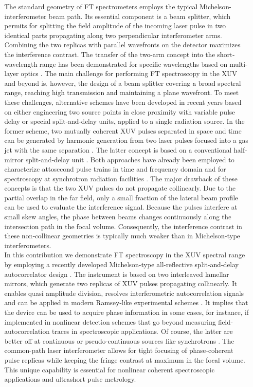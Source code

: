 \documentclass[fleqn,10pt]{wlscirep}
\begin{document}
The standard geometry of FT spectrometers employs the typical Michelson-interferometer beam path. Its essential component is a beam splitter, which permits for splitting the field amplitude of the incoming laser pulse in two identical parts propagating along two perpendicular interferometer arms. Combining the two replicas with parallel wavefronts on the detector maximizes the interference contrast. The transfer of the two-arm concept into the short-wavelength range has been demonstrated for specific wavelengths based on multi-layer optics \cite{Hilbert2013,Hilbert2014}. The main challenge for performing FT spectroscopy in the XUV and beyond is, however, the design of a beam splitter covering a broad spectral range, reaching high transmission and maintaining a plane wavefront. To meet these challenges, alternative schemes have been developed in recent years based on either engineering two source points in close proximity with variable pulse delay or special split-and-delay units, applied to a single radiation source. In the former scheme, two mutually coherent XUV pulses separated in space and time can be generated by harmonic generation from two laser pulses focused into a gas jet with the same separation \cite{Kovacev2005,Tzallas2003,Jansen2016}. The latter concept is based on a conventional half-mirror split-and-delay unit \cite{Mashiko2003,Mashiko2020}. Both approaches have already been employed to characterize attosecond pulse trains in time and frequency domain \cite{Chen2014,Jansen2016} and for spectroscopy at synchrotron radiation facilities \cite{Oliveira2011}. The major drawback of these concepts is that the two XUV pulses do not propagate collinearly. Due to the partial overlap in the far field, only a small fraction of the lateral beam profile can be used to evaluate the interference signal. Because the pulses interfere at small skew angles, the phase between beams changes continuously along the intersection path in the focal volume. Consequently, the interference contrast in these non-collinear geometries is typically much weaker than in Michelson-type interferometers.\\

In this contribution we demonstrate FT spectroscopy in the XUV spectral range by employing a recently developed Michelson-type all-reflective split-and-delay autocorrelator design \cite{Gebert2014}. The instrument is based on two interleaved lamellar mirrors, which generate two replicas of XUV pulses propagating collinearly. It enables quasi amplitude division, resolves interferometric autocorrelation signals and can be applied in modern Ramsey-like experimental schemes \cite{Eramo2011}. It implies that the device can be used to acquire phase information in some cases, for instance, if implemented in nonlinear detection schemes that go beyond measuring field-autocorrelation traces in spectroscopic applications. Of course, the latter are better off at continuous or pseudo-continuous sources like synchrotrons \cite{Oliveira2011}. The common-path laser interferometer allows for tight focusing of phase-coherent pulse replicas while keeping the fringe contrast at maximum in the focal volume. This unique capability is essential for nonlinear coherent spectroscopic applications and ultrashort pulse metrology.              
\end{document}
